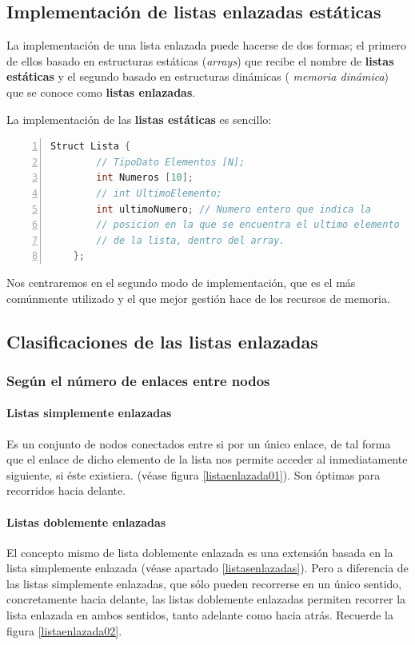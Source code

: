 \documentclass[a4paper, 11pt, titlepage]{article}
\begin{document}
    \subsection{Implementación de listas enlazadas estáticas}

        La implementación de una lista enlazada puede hacerse de dos formas; el primero de 
        ellos basado en estructuras estáticas (\textit{arrays}) que recibe el nombre de 
        \textbf{listas estáticas} y el segundo basado en estructuras dinámicas (
        \textit{memoria dinámica}) que se conoce como \textbf{listas enlazadas}.

        La implementación de las \textbf{listas estáticas} es sencillo:

        \begin{lstlisting}[language=C,numbers=left]
    Struct Lista {
        // TipoDato Elementos [N];
        int Numeros [10];
        // int UltimoElemento;
        int ultimoNumero; // Numero entero que indica la 
        // posicion en la que se encuentra el ultimo elemento
        // de la lista, dentro del array.
    };\end{lstlisting}

        Nos centraremos en el segundo modo de implementación, que es el más comúnmente 
        utilizado y el que mejor gestión hace de los recursos de memoria.

    \subsection{Clasificaciones de las listas enlazadas}
        
        \subsubsection{Según el número de enlaces entre nodos}

            \paragraph{Listas simplemente enlazadas} Es un conjunto de nodos conectados 
            entre si por un único enlace, de tal forma que el enlace de dicho elemento de
            la lista nos permite acceder al inmediatamente siguiente, si éste existiera. 
            (véase figura \ref{listaenlazada01}). Son óptimas para recorridos hacia delante. 

            \paragraph{Listas doblemente enlazadas} \label{listadoblementeenlazada} 
            El concepto mismo de lista doblemente enlazada es una extensión basada en la lista simplemente 
            enlazada (véase apartado \ref{listasenlazadas}). Pero a diferencia de las listas simplemente enlazadas, 
            que sólo pueden recorrerse en un único sentido, concretamente hacia delante, las listas doblemente 
            enlazadas permiten recorrer la lista enlazada en ambos sentidos, tanto adelante como hacia 
            atrás. Recuerde la figura \ref{listaenlazada02}.
    
\end{document}
